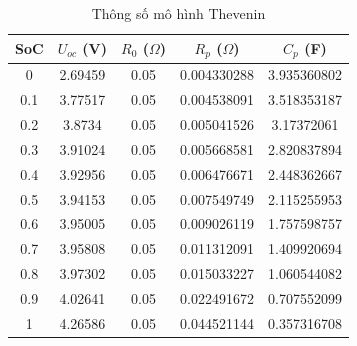 \documentclass{thesis}
\begin{document}
    \begin{table}[H]
        \centering
        \begin{tabular}{|c|c|c|c|c|}
            \hline
            \textbf{SoC} & \textbf{$U_{oc}$ (V)} & \textbf{$R_0$ ($\Omega$)} & \textbf{$R_p$ ($\Omega$)} & \textbf{$C_p$ (F)} \\
            \hline
            0 & 2.69459 & 0.05 & 0.004330288 & 3.935360802 \\
            0.1 & 3.77517 & 0.05 & 0.004538091 & 3.518353187 \\
            0.2 & 3.8734 & 0.05 & 0.005041526 & 3.17372061 \\
            0.3 & 3.91024 & 0.05 & 0.005668581 & 2.820837894 \\
            0.4 & 3.92956 & 0.05 & 0.006476671 & 2.448362667 \\
            0.5 & 3.94153 & 0.05 & 0.007549749 & 2.115255953 \\
            0.6 & 3.95005 & 0.05 & 0.009026119 & 1.757598757 \\
            0.7 & 3.95808 & 0.05 & 0.011312091 & 1.409920694 \\
            0.8 & 3.97302 & 0.05 & 0.015033227 & 1.060544082 \\
            0.9 & 4.02641 & 0.05 & 0.022491672 & 0.707552099 \\
            1 & 4.26586 & 0.05 & 0.044521144 & 0.357316708 \\
            \hline
        \end{tabular}
        \caption{Thông số mô hình Thevenin}
        \label{tab:thevenin}
    \end{table}
\end{document}
